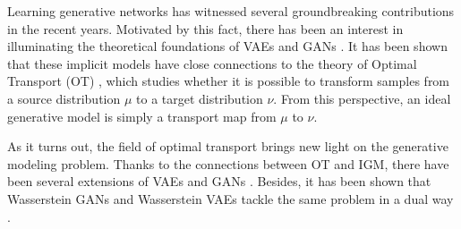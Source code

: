 





Learning generative networks has witnessed several groundbreaking contributions in the recent years. Motivated by this fact, there has been an interest in illuminating the theoretical foundations of VAEs and GANs \cite{bousquet2017optimal,liu2017approximation}. 
%
It has been shown that these implicit models have close connections to the theory of Optimal Transport (OT) \cite{villani2008optimal}, which studies whether it is possible to transform samples from a source distribution $\mu$ to a target distribution $\nu$. From this perspective, an ideal generative model is simply a transport map from $\mu$ to $\nu$.  

As it turns out, the field of optimal transport brings new light on the generative modeling problem. Thanks to the connections between OT and IGM, there have been several extensions of VAEs \cite{tolstikhin2017wasserstein,kolouri2018sliced} and GANs \cite{arjovsky2017wasserstein,gulrajani2017improved,guo2017relaxed,lei2017geometric}. Besides, it has been shown that Wasserstein GANs \cite{arjovsky2017wasserstein} and Wasserstein VAEs \cite{tolstikhin2017wasserstein} tackle the same problem in a dual way \cite{bousquet2017optimal,genevay2017gan}. 

